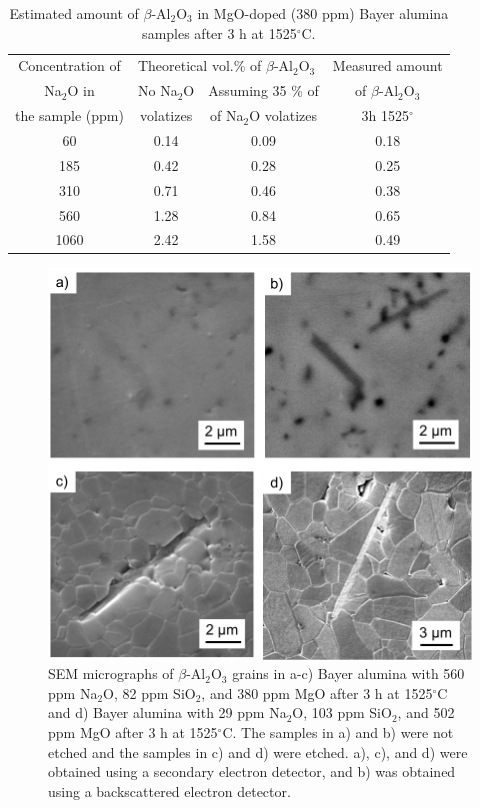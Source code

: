 \newpage
\begin{table}[H]
	\caption{Estimated amount of $\beta$-Al$_{2}$O$_{3}$ in MgO-doped (380 ppm) Bayer alumina samples after 3 h at 1525$^{\circ}$C.}
	\centering
	\begin{tabular}{ | c | c | c | c | }
		\hline
		Concentration of  & \multicolumn{2}{l|}{Theoretical vol.\% of $\beta$-Al$_{2}$O$_{3}$} & Measured amount \\
		\cline{2-3}
		Na$_{2}$O in & No Na$_{2}$O & Assuming 35 \% of & of $\beta$-Al$_{2}$O$_{3}$\\
		the sample (ppm) & volatizes & of Na$_{2}$O volatizes & 3h 1525$^{\circ}$\\		
		\hline
		60 & 0.14 & 0.09 & 0.18\\
		\hline
		185 & 0.42 & 0.28 & 0.25\\
		\hline
		310 & 0.71 & 0.46 & 0.38\\
		\hline
		560 & 1.28 & 0.84 & 0.65\\
		\hline
		1060 & 2.42 & 1.58 & 0.49\\
		\hline
	\end{tabular}
	\label{Ch5-table:table1}
\end{table}
\clearpage

\newpage
\begin{figure}[H]
	\centering
	\includegraphics[width=\textwidth]{Chapter-5/Figures/Figure1.png}
	\caption{SEM micrographs of $\beta$-Al$_{2}$O$_{3}$ grains in a-c) Bayer alumina with 560 ppm Na$_{2}$O, 82 ppm SiO$_{2}$, and 380 ppm MgO after 3 h at 1525$^{\circ}$C and d) Bayer alumina with 29 ppm Na$_{2}$O, 103 ppm SiO$_{2}$, and 502 ppm MgO after 3 h at 1525$^{\circ}$C. The samples in a) and b) were not etched and the samples in c) and d) were etched. a), c), and d) were obtained using a secondary electron detector, and b) was obtained using a backscattered electron detector.}
	\label{Ch5-figure:Figure1}
\end{figure}

